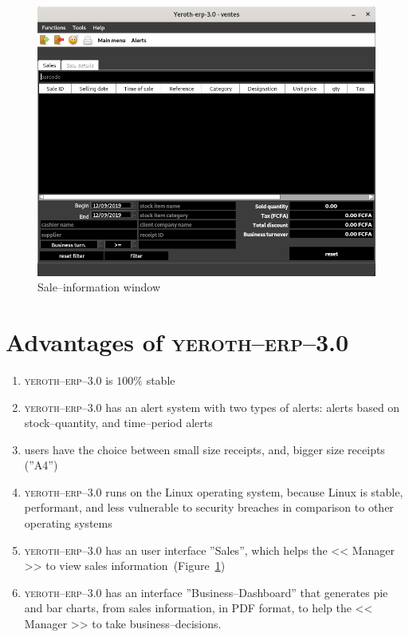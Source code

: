 \documentclass[a4paper, 10pt, twocolumn]{article}
\newcommand{\yeren}{\textsc{yeroth--erp--3.0}\xspace}
\newcommand{\manager}{<< Manager >>\xspace}
\begin{document}
\begin{figure}[!htbp]
\centering
\includegraphics[scale=0.32]{../../francais/images/yeren-window-sale-information.png}
\caption{Sale--information window}
\label{fig:fenetre-de-la-vente}
\end{figure}

\vspace{-1.9em}
\section{Advantages of \yeren}
\vspace{-0.9em}
\begin{enumerate}[1)]
	\itemsep -0.3em
	\item \yeren is $100\%$ stable
	\item \yeren has an alert system with two types of alerts:
	      alerts based on stock--quantity, and time--period alerts
	\item users have the choice between small size receipts,
	      and, bigger size receipts (''A4'')
	\item \yeren runs on the Linux operating system,
	      because Linux is stable, performant, and less
	      vulnerable to security breaches in comparison
	      to other operating systems
	\item \yeren has an user interface ''Sales'', which
	      helps the \manager to view sales
	      information~(Figure~\ref{fig:fenetre-de-la-vente})
	\item \yeren has an interface ''Business--Dashboard'' that
		  generates pie and bar charts, from sales information,
		  in PDF format, to help the \manager to take
		  business--decisions.
\end{enumerate}
\end{document}
